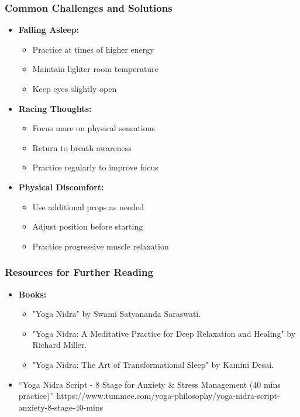 \begin{frame}[fragile]\frametitle{Common Challenges and Solutions}
    \begin{itemize}
        \item \textbf{Falling Asleep:}
        \begin{itemize}
            \item Practice at times of higher energy
            \item Maintain lighter room temperature
            \item Keep eyes slightly open
        \end{itemize}
        \item \textbf{Racing Thoughts:}
        \begin{itemize}
            \item Focus more on physical sensations
            \item Return to breath awareness
            \item Practice regularly to improve focus
        \end{itemize}
        \item \textbf{Physical Discomfort:}
        \begin{itemize}
            \item Use additional props as needed
            \item Adjust position before starting
            \item Practice progressive muscle relaxation
        \end{itemize}
    \end{itemize}
\end{frame}

\begin{frame}[fragile]\frametitle{Resources for Further Reading}
    \begin{itemize}
        \item \textbf{Books:}
        \begin{itemize}
            \item "Yoga Nidra" by Swami Satyananda Saraswati.
            \item "Yoga Nidra: A Meditative Practice for Deep Relaxation and Healing" by Richard Miller.
            \item "Yoga Nidra: The Art of Transformational Sleep" by Kamini Desai.
        \end{itemize}
		\item ``Yoga Nidra Script - 8 Stage for Anxiety \& Stress Management (40 mins practice)'' https://www.tummee.com/yoga-philosophy/yoga-nidra-script-anxiety-8-stage-40-mins
    \end{itemize}
\end{frame}